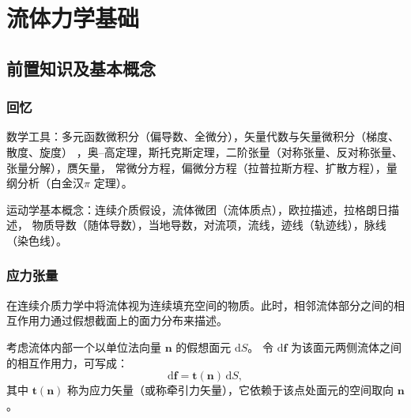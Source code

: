 \ifx\allfiles\undefined
{}  %
\usepackage[dvipsnames]{xcolor}
\usepackage{amsmath}   %
\usepackage{graphicx}
\usetikzlibrary{arrows, calc, decorations.pathmorphing}
\allowdisplaybreaks %
\newcommand{\pa}{\partial}
\newcommand{\mT}{\raisebox{0.1ex}{$\scriptstyle -T$}} %
\newcommand{\lmT}{\raisebox{-0.85ex}{$\scriptstyle -T$}} %
\newcommand{\mone}{\raisebox{0.1ex}{$\scriptstyle -1$}} %
\newcommand{\lmone}{\raisebox{-0.85ex}{$\scriptstyle -1$}} %
\newcommand{\lsup}[1]{\raisebox{-0.1ex}{$\scriptstyle #1$}}
\newcommand{\llsup}[1]{\raisebox{-0.85ex}{$\scriptstyle #1$}}
\newcommand{\mathminus}{\!\!-\!\!} %
\newcommand{\vvec}[1]{\symbf{#1}}
\newcommand{\ten}[1]{\mathbb{#1}}



\else
\fi
\chapter{流体力学基础}
\section{前置知识及基本概念}
\subsection{回忆}
数学工具：多元函数微积分（偏导数、全微分），矢量代数与矢量微积分（梯度、散度、旋度）
，奥--高定理，斯托克斯定理，二阶张量（对称张量、反对称张量、张量分解），赝矢量，
常微分方程，偏微分方程（拉普拉斯方程、扩散方程），量纲分析（白金汉\(\pi\) 定理）。

运动学基本概念：连续介质假设，流体微团（流体质点），欧拉描述，拉格朗日描述，
物质导数（随体导数），当地导数，对流项，流线，迹线（轨迹线），脉线（染色线）。
\subsection{应力张量} 
在连续介质力学中将流体视为连续填充空间的物质。此时，相邻流体部分之间的相互作用力通过假想截面上的面力分布来描述。

考虑流体内部一个以单位法向量 $\mathbf{n}$ 的假想面元 $\mathrm{d}S$。
令 $\mathrm{d}\mathbf{f}$ 为该面元两侧流体之间的相互作用力，可写成：
\begin{equation}
\mathrm{d}\mathbf{f} = \mathbf{t}(\mathbf{n}) \, \mathrm{d}S,
\end{equation}
其中 $\mathbf{t}(\mathbf{n})$ 称为应力矢量（或称牵引力矢量），它依赖于该点处面元的空间取向 $\mathbf{n}$。

